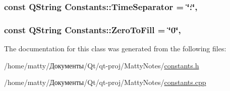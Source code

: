 \subsubsection[{\texorpdfstring{Time\+Separator}{TimeSeparator}}]{\setlength{\rightskip}{0pt plus 5cm}const Q\+String Constants\+::\+Time\+Separator = \char`\"{}\+:\char`\"{}\hspace{0.3cm}{\ttfamily [static]}, {\ttfamily [private]}}\hypertarget{class_constants_aa6a4e4e111634badc8b8aeba9df024ce}{}\label{class_constants_aa6a4e4e111634badc8b8aeba9df024ce}
\subsubsection[{\texorpdfstring{Zero\+To\+Fill}{ZeroToFill}}]{\setlength{\rightskip}{0pt plus 5cm}const Q\+String Constants\+::\+Zero\+To\+Fill = \char`\"{}0\char`\"{}\hspace{0.3cm}{\ttfamily [static]}, {\ttfamily [private]}}\hypertarget{class_constants_ace4bddf4b2dc0e05c8fec643238531a9}{}\label{class_constants_ace4bddf4b2dc0e05c8fec643238531a9}


The documentation for this class was generated from the following files\+:\begin{DoxyCompactItemize}
\item 
/home/matty/Документы/\+Qt/qt-\/proj/\+Matty\+Notes/\hyperlink{constants_8h}{constants.\+h}\item 
/home/matty/Документы/\+Qt/qt-\/proj/\+Matty\+Notes/\hyperlink{constants_8cpp}{constants.\+cpp}\end{DoxyCompactItemize}
